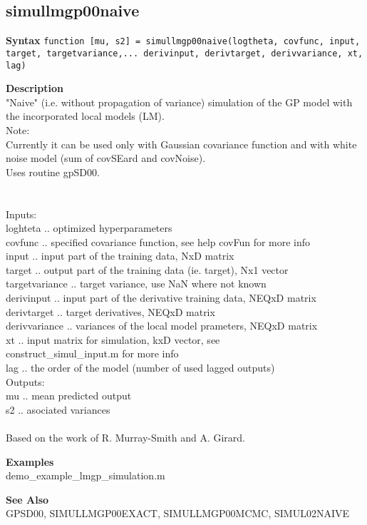 \subsection*{simullmgp00naive} \label{fun:simullmgp00naive}


\textbf{Syntax}
\texttt{function [mu, s2] = simullmgp00naive(logtheta, covfunc, input, target, targetvariance,...
  derivinput, derivtarget, derivvariance, xt, lag)}

\textbf{Description}
\\ "Naive" (i.e. without propagation of variance) simulation of the GP
 model with the incorporated local models (LM).
\\ Note:
\\Currently it can be used only with Gaussian covariance function
and
 with white noise model (sum of covSEard and covNoise).
\\ Uses routine gpSD00.
\\
\\
\\ Inputs:
\\ loghteta .. optimized hyperparameters
\\ covfunc .. specified covariance function, see help covFun for more info
\\ input .. input part of the training data,  NxD matrix
\\ target .. output part of the training data (ie. target), Nx1 vector
\\ targetvariance .. target variance, use NaN where not known
\\ derivinput .. input part of the derivative training data, NEQxD matrix
\\ derivtarget .. target derivatives, NEQxD matrix
\\ derivvariance .. variances of the local model prameters, NEQxD matrix
\\ xt .. input matrix for simulation, kxD vector, see
\\   construct\_simul\_input.m for more info
\\ lag .. the order of the model (number of used lagged outputs)
\\ Outputs:
\\ mu .. mean predicted output
\\ s2 .. asociated variances
\\
\\ Based on the work of R. Murray-Smith and A. Girard.

\textbf{Examples}
\\ demo\_example\_lmgp\_simulation.m

\textbf{See Also}
\\ GPSD00, SIMULLMGP00EXACT, SIMULLMGP00MCMC, SIMUL02NAIVE
